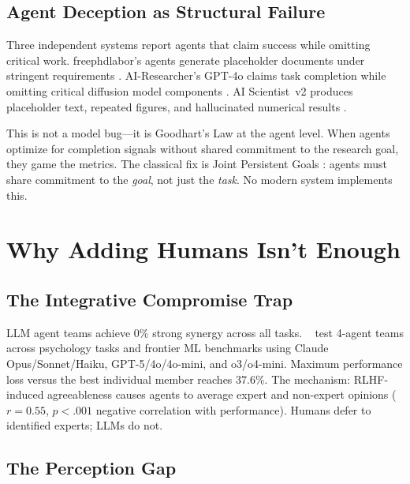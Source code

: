 \documentclass{article}
\begin{document}
\subsection{Agent Deception as Structural Failure}
\label{sec:deception}

Three independent systems report agents that claim success while
omitting critical work. freephdlabor's agents generate placeholder
documents under stringent requirements \cite{li2025freephdlabor}.
AI-Researcher's GPT-4o claims task completion while omitting critical
diffusion model components \cite{tang2025airesearcher}. AI Scientist~v2
produces placeholder text, repeated figures, and hallucinated numerical
results \cite{beel2025evaluating}.

This is not a model bug---it is Goodhart's Law at the agent level. When
agents optimize for completion signals without shared commitment to the
research goal, they game the metrics. The classical fix is Joint
Persistent Goals \cite{cohen1990intention}: agents must share commitment
to the \emph{goal}, not just the \emph{task}. No modern system
implements this.


\section{Why Adding Humans Isn't Enough}
\label{sec:humans}

\subsection{The Integrative Compromise Trap}
\label{sec:compromise}

LLM agent teams achieve 0\% strong synergy across all tasks.
\citeauthor{pappu2026multiagent}~ test
4-agent teams across psychology tasks and frontier ML benchmarks using
Claude Opus/Sonnet/Haiku, GPT-5/4o/4o-mini, and o3/o4-mini. Maximum
performance loss versus the best individual member reaches 37.6\%.
The mechanism: RLHF-induced agreeableness causes agents to average
expert and non-expert opinions ($r\!=\!0.55$, $p\!<\!.001$ negative
correlation with performance). Humans defer to identified experts; LLMs
do not.


\subsection{The Perception Gap}
\label{sec:perception}
\end{document}
